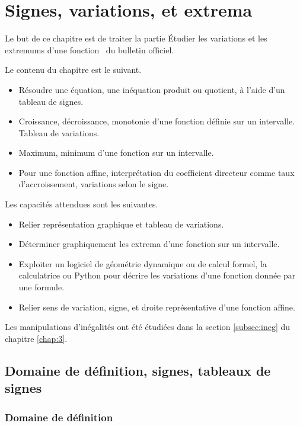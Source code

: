 
\chapter{Signes, variations, et extrema}

Le but de ce chapitre est de traiter la partie \og Étudier les variations et les extremums d'une fonction \fg~du bulletin officiel.

Le contenu du chapitre est le suivant.
	\begin{itemize}
		\item Résoudre une équation, une inéquation produit ou quotient, à l'aide d'un tableau de signes.
		\item Croissance, décroissance, monotonie d'une fonction définie sur un intervalle. Tableau de variations.
		\item Maximum, minimum d'une fonction sur un intervalle.
		\item Pour une fonction affine, interprétation du coefficient directeur comme taux d'accroissement, variations selon le signe.
	\end{itemize}

Les capacités attendues sont les suivantes.
	\begin{itemize}
		\item Relier représentation graphique et tableau de variations.
		\item Déterminer graphiquement les extrema d'une fonction sur un intervalle.
		\item Exploiter un logiciel de géométrie dynamique ou de calcul formel, la calculatrice ou Python pour décrire les variations d'une fonction donnée par une formule.
		\item Relier sens de variation, signe, et droite représentative d'une fonction affine.
	\end{itemize}
	

Les manipulations d'inégalités ont été étudiées dans la section \ref{subsec:ineg} du chapitre \ref{chap:3}.

\section{Domaine de définition, signes, tableaux de signes}

\subsection{Domaine de définition}

